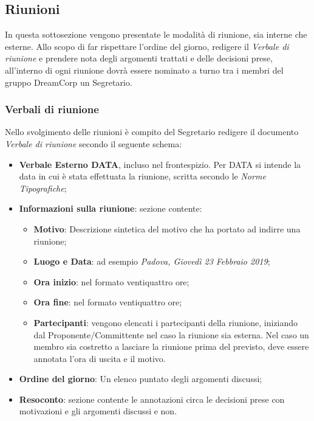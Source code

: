             \subsection{Riunioni}
                In questa sottosezione vengono presentate le modalità di riunione, sia interne che esterne.
                Allo scopo di far rispettare l'ordine del giorno, redigere il \textit{Verbale di riunione} e prendere nota degli argomenti trattati e delle decisioni prese, all'interno di ogni riunione dovrà essere nominato a turno tra i membri del gruppo DreamCorp un Segretario.
                \subsubsection{Verbali di riunione}
                   Nello svolgimento delle riunioni è compito del Segretario redigere il documento \textit{Verbale di riunione} secondo il seguente schema:
                    \begin{itemize}
                        \item \textbf{Verbale Esterno DATA}, incluso nel frontespizio. Per DATA si intende la data in cui è stata effettuata la riunione, scritta secondo le \textit{Norme Tipografiche};
                        \item \textbf{Informazioni sulla riunione}: sezione contente:
                        \begin{itemize}
                            \item \textbf{Motivo}: Descrizione sintetica del motivo che ha portato ad indirre una riunione;
                            \item \textbf{Luogo e Data}: ad esempio \textit{Padova, Giovedì 23 Febbraio 2019}; 
                            \item \textbf{Ora inizio}: nel formato ventiquattro ore;
                            \item \textbf{Ora fine}: nel formato ventiquattro ore;
                            \item \textbf{Partecipanti}: vengono elencati i partecipanti della riunione, iniziando dal Proponente/Committente nel caso la riunione sia esterna. Nel caso un membro sia costretto a lasciare la riunione prima del previsto, deve essere annotata l'ora di uscita e il motivo.
                        \end{itemize}
                        \item \textbf{Ordine del giorno}: Un elenco puntato degli argomenti discussi; 
                        \item \textbf{Resoconto}: sezione contente le annotazioni circa le decisioni prese con motivazioni e gli argomenti discussi e non.
                    \end{itemize}
